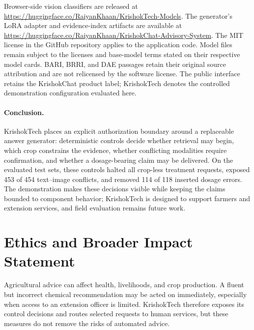 \documentclass[11pt,a4paper]{article}
\begin{document}
Browser-side vision classifiers are released at \url{https://huggingface.co/RaiyanKhaan/KrishokTech-Models}. The generator's LoRA adapter and evidence-index artifacts are available at \url{https://huggingface.co/RaiyanKhaan/KrishokChat-Advisory-System}. The MIT license in the GitHub repository applies to the application code. Model files remain subject to the licenses and base-model terms stated on their respective model cards. BARI, BRRI, and DAE passages retain their original source attribution and are not relicensed by the software license. The public interface retains the KrishokChat product label; KrishokTech denotes the controlled demonstration configuration evaluated here.

\paragraph{Conclusion.}
\label{sec:final_conclusion}
KrishokTech places an explicit authorization boundary around a replaceable answer generator: deterministic controls decide whether retrieval may begin, which crop constrains the evidence, whether conflicting modalities require confirmation, and whether a dosage-bearing claim may be delivered. On the evaluated test sets, these controls halted all crop-less treatment requests, exposed 453 of 454 text--image conflicts, and removed 114 of 118 inserted dosage errors. The demonstration makes these decisions visible while keeping the claims bounded to component behavior; KrishokTech is designed to support farmers and extension services, and field evaluation remains future work.

\clearpage
\section*{Ethics and Broader Impact Statement}
\label{sec:ethics}

Agricultural advice can affect health, livelihoods, and crop production. A fluent but incorrect chemical recommendation may be acted on immediately, especially when access to an extension officer is limited. KrishokTech therefore exposes its control decisions and routes selected requests to human services, but these measures do not remove the risks of automated advice.
\end{document}
